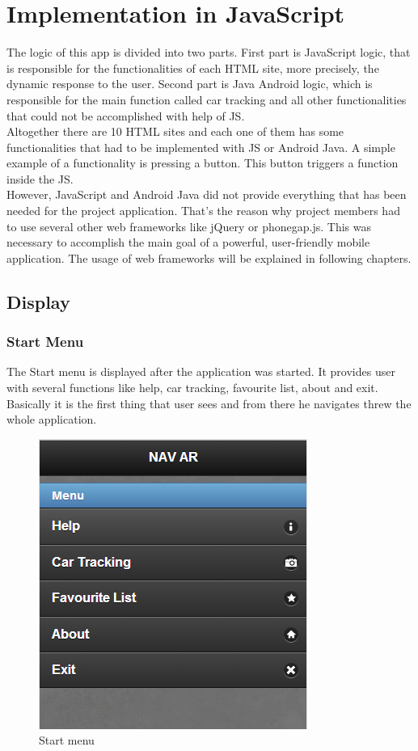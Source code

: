\chapter{Implementation in JavaScript} \label{chapter:desgin}

The logic of this app is divided into two parts. First part is JavaScript logic, that is responsible for the functionalities of each HTML site, more precisely, the dynamic response to the user. Second part is Java Android logic, which is responsible for the main function called car tracking and all other functionalities that could not be accomplished with help of JS. 
\\

Altogether there are 10 HTML sites and each one of them has some functionalities that had to be implemented with JS or Android Java. A simple example of a functionality is pressing a button. This button triggers a function inside the JS. 
\\

However, JavaScript and Android Java did not provide everything that has been needed for the project application. That's the reason why project members had to use several other web frameworks like jQuery or phonegap.js. This was necessary to accomplish the main goal of a powerful, user-friendly mobile application. The usage of web frameworks will be explained in following chapters. 
\newpage



\section{Display}

\subsection{Start Menu}
The Start menu is displayed after the application was started. It provides user with several functions like help, car tracking, favourite list, about and exit. Basically it is the first thing that user sees and from there he navigates threw the whole application.
\\

\begin{figure}[h]
\centering
\includegraphics[width=0.5\linewidth]{graphics/chapter4/1}
\caption{Start menu}
\end{figure}


